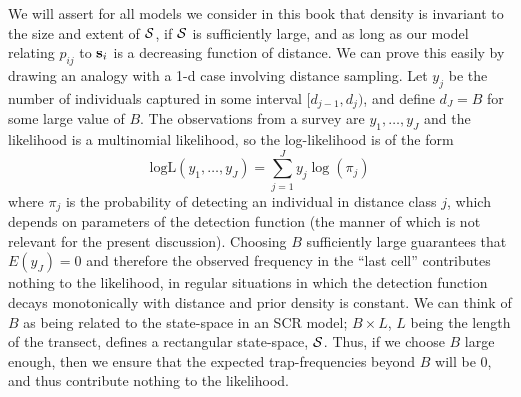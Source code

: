 We will assert for all models we consider in this book that density is
invariant to the size and extent of ${\cal S}$, if ${\cal S}$ is
sufficiently large, and as long as our model relating $p_{ij}$ to
${\bf s}_{i}$ is a decreasing function of distance.  We can prove this
easily by drawing an analogy with a 1-d case involving distance
sampling.  Let $y_{j}$ be the number of individuals captured in some
interval $[d_{j-1},d_{j})$, and define $d_{J} = B$ for some large
value of $B$.
 The observations from a survey are $y_{1},\ldots,y_J$
and the likelihood is a multinomial likelihood, so the log-likelihood
is of the form
\[
\mbox{logL}(y_{1},\ldots,y_{J}) = \sum_{j=1}^{J} y_{j} \log( \pi_{j} )
\]
where $\pi_{j}$ is the probability of detecting an individual in
distance class $j$, which depends on parameters of the detection
function (the manner of which is not relevant for the present
discussion).  Choosing $B$ sufficiently large guarantees that $E(y_{J})
= 0$ and therefore the observed frequency in the ``last cell''
contributes nothing to the likelihood, in regular situations in which
the detection function decays monotonically with distance and prior
density is constant.
We can think of $B$ as being related to the state-space
in an SCR model; $B \times L$, $L$ being the length of the transect, defines
a rectangular state-space, ${\cal S}$. Thus, if we choose $B$ large enough, then
we ensure that the expected trap-frequencies beyond $B$ will be 0, and
thus contribute nothing to the likelihood.

